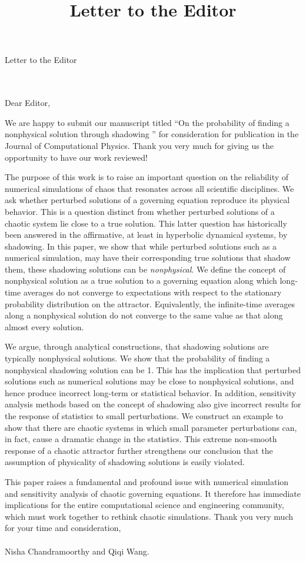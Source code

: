 \documentclass{letter}
\title{Letter to the Editor}
\begin{document}
\hspace{1.6in} 
\begin{large}{Letter to the Editor}\end{large}
\\
\\
Dear Editor,

We are happy to submit our manuscript titled 
``On the probability of finding a nonphysical solution through shadowing ''
for consideration for publication in the Journal of Computational Physics. Thank you very much for giving us the 
opportunity to have our work reviewed!

The purpose of this work is to raise an important question on the reliability of numerical simulations of chaos that resonates across all scientific disciplines. We ask whether perturbed solutions of a 
governing equation reproduce its physical behavior. This is a question distinct from whether perturbed solutions of a chaotic system lie close to a true solution. This latter question has historically been answered in the affirmative, at least in hyperbolic dynamical systems, by shadowing. In this paper, we show that while
perturbed solutions such as a numerical simulation, 
may have their corresponding true solutions that shadow them, these shadowing solutions can be \emph{nonphysical}. We define the concept of nonphysical solution as a true solution to a governing equation along which long-time averages do not converge to expectations with respect to the stationary probability distribution on the attractor. Equivalently, the infinite-time averages along a nonphysical solution do not converge to the same value as that along almost every solution.

We argue, through analytical constructions, that shadowing solutions are typically nonphysical solutions. We show that the probability of finding a nonphysical shadowing solution can be 1. This has the implication that perturbed solutions such as numerical solutions may be close to nonphysical solutions, and hence produce incorrect long-term or statistical behavior. In addition, sensitivity analysis methods based on the concept of shadowing also give incorrect results for the response of statistics to small perturbations. We construct an example to show that 
there are chaotic systems in which small parameter perturbations can, in fact, cause a dramatic change in the statistics. This extreme non-smooth response of a chaotic attractor further strengthens our conclusion that the assumption of physicality of shadowing solutions is easily violated.

This paper raises a fundamental and profound issue with numerical simulation and sensitivity analysis of chaotic governing equations. It therefore has immediate implications for the entire computational science and engineering community, which must work together to rethink chaotic simulations. 
Thank you very much for your time and consideration,
\\
\\
Nisha Chandramoorthy and Qiqi Wang.
\end{document}

